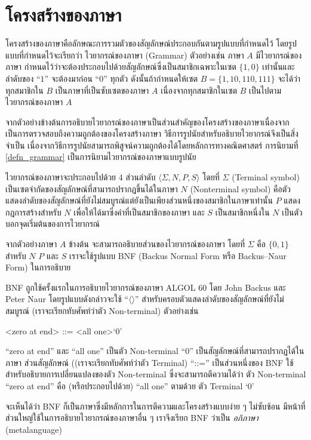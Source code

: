 \section{โครงสร้างของภาษา}
%
\par{
โครงสร้างของภาษาคือลักษณะการรวมตัวของสัญลักษณ์ประกอบกันตามรูปแบบที่กำหนดไว้
โดยรูปแบบที่กำหนดไว้จะเรียกว่า ไวยากรณ์ของภาษา (Grammar)
ตัวอย่างเช่น ภาษา $A$ มีไวยากรณ์ของภาษา
กำหนดไว้ว่าจะต้องประกอบไปด้วยสัญลักษณ์ซึ่งเป็นสมาชิกเฉพาะในเซต 
$\{1,0\}$ เท่านั้นและลำดับของ ``$1$'' จะต้องมาก่อน ``$0$'' ทุกตัว
ดังนั้นถ้ากำหนดให้เซต $B = \{1, 10, 110, 111\}$ 
จะได้ว่าทุกสมาชิกใน $B$ เป็นภาษาที่เป็นซับเซตของภาษา $A$ 
เนื่องจากทุกสมาชิกในเซต $B$ เป็นไปตามไวยากรณ์ของภาษา $A$
}
%
\par{
จากตัวอย่างข้างต้นการอธิบายไวยากรณ์ของภาษาเป็นส่วนสำคัญของโครงสร้างของภาษาเนื่องจากเป็นการตรวจสอบถึงความถูกต้องของโครงสร้างภาษา
วิธีการรูปนัยสำหรับอธิบายไวยากรณ์จึงเป็นสิ่งจำเป็น
เนื่องจากวิธีการรูปนัยสามารถพิสูจน์ความถูกต้องได้โดยหลักการทางคณิตศาสตร์
การนิยามที่ \ref{defn_grammar} เป็นการนิยามไวยากรณ์ของภาษาแบบรูปนัย
%
\begin{defn}
\label{defn_grammar}
ไวยากรณ์ของภาษาจะประกอบไปด้วย 4 ส่วนลำดับ 
$\langle \Sigma, N, P, S\rangle$ โดยที่ 
$\Sigma$ (Terminal symbol) 
เป็นเซตจำกัดของสัญลักษณ์ที่สามารถปรากฎขึ้นได้ในภาษา 
$N$ (Nonterminal symbol) 
คือตัวแสดงลำดับของสัญลักษณ์ที่ยังไม่สมบูรณ์แต่ยังเป็นเพียงส่วนหนึ่งของสมาชิกในภาษาเท่านั้น 
$P$ แสดงกฎการสร้างสำหรับ 
$N$ เพื่อให้ได้มาซึ่งคำที่เป็นสมาชิกของภาษา และ 
$S$ เป็นสมาชิกหนึ่งใน $N$ เป็นตัวบอกจุดเริ่มต้นของการไวยากรณ์
\end{defn}
}
%
\par{
จากตัวอย่างภาษา $A$ ข้างต้น 
จะสามารถอธิบายส่วนของไวยากรณ์ของภาษา
โดยที่ $\Sigma$ คือ $\{0,1\}$ สำหรับ 
$N$ $P$ และ $S$ 
เราจะใช้รูปแบบ 
BNF (Backus Normal Form หรือ Backus–Naur Form)
ในการอธิบาย
}
%

\par{
BNF ถูกใช้ครั้งแรกในการอธิบายไวยากรณ์ของภาษา 
ALGOL 60 โดย 
John Backus และ Peter Naur 
โดยรูปแบบดังกล่าวจะใช้ 
``$\langle \rangle$'' 
สำหรับครอบตัวแสดงลำดับของสัญลักษณ์ที่ยังไม่สมบูรณ์
(เราจะเรียกทับศัพท์ว่าตัว Non-terminal)
ตัวอย่างเช่น
%
\begin{grammar}
<zero at end> ::= <all one>`0' 
\end{grammar}
%
``zero at end'' และ ``all one'' เป็นตัว Non-terminal
``0'' เป็นสัญลักษณ์ที่สามารถปรากฏได้ในภาษา
ส่วนสัญลักษณ์ ((เราจะเรียกทับศัพท์ว่าตัว Terminal) ``::='' 
เป็นส่วนหนึ่งของ BNF ใช้สำหรับอธิบายการเปลี่ยนแปลงของตัว Non-terminal
ซึ่งจะสามารถตีความได้ว่า ตัว Non-terminal ``zero at end'' คือ (หรือประกอบไปด้วย)
``all one'' ตามด้วย ตัว Terminal `0'
}
%
\par{
จะเห็นได้ว่า BNF ก็เป็นภาษาซึ่งมีหลักการในการตีความและโครงสร้างแบบง่าย ๆ 
ไม่ซับซ้อน มีหน้าที่ส่วนใหญ่ใช้ในการอธิบายไวยากรณ์ของภาษาอื่น ๆ 
เราจึงเรียก BNF ว่าเป็น \textit{อภิภาษา} (metalanguage)
}
%
